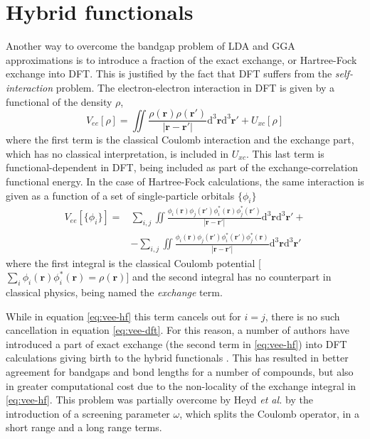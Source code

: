 \section{Hybrid functionals}
\label{sec:app-hybrid}
Another way to overcome the bandgap problem of LDA and GGA approximations is to introduce a fraction of the exact exchange, or Hartree-Fock exchange into DFT. This is justified by the fact that DFT suffers from the \textit{self-interaction} problem. The electron-electron interaction in DFT is given by a functional of the density $\rho$,
\begin{equation}
 V_{ee}[\rho] = \iint \frac{\rho(\bm{r})\rho(\bm{r'})}{|\bm{r}-\bm{r'}|} \mathrm{d^3}\bm{r}\mathrm{d^3}\bm{r'} + U_{xc}[\rho]
 \label{eq:vee-dft}
\end{equation}
where the first term is the classical Coulomb interaction and the exchange part, which has no classical interpretation, is included in $U_{xc}$. This last term is functional-dependent in DFT, being included as part of the exchange-correlation functional energy. In the case of Hartree-Fock calculations, the same interaction is given as a function of a set of single-particle orbitals $\{\phi_i\}$
\begin{align}
 V_{ee}[\{\phi_i\}] =& \sum_{i,j} \iint \frac{\phi_i(\bm{r})\phi_j(\bm{r'})\phi_i^*(\bm{r})\phi_j^*(\bm{r'})}{|\bm{r}-\bm{r'}|} \mathrm{d^3}\bm{r} \mathrm{d^3}\bm{r'} + \nonumber \\ &- \sum_{i,j}\iint \frac{\phi_i(\bm{r})\phi_j(\bm{r'})\phi_i^*(\bm{r'})\phi_j^*(\bm{r})}{|\bm{r}-\bm{r'}|} \mathrm{d^3}\bm{r} \mathrm{d^3}\bm{r'}
 \label{eq:vee-hf}
\end{align}
where the first integral is the classical Coulomb potential [$\sum_i \phi_i(\bm{r})\phi_i^*(\bm{r}) = \rho(\bm{r})$] and the second integral has no counterpart in classical physics, being named the \textit{exchange} term.

While in equation \ref{eq:vee-hf} this term cancels out for $i = j$, there is no such cancellation in equation \ref{eq:vee-dft}. For this reason, a number of authors have introduced a part of exact exchange (the second term in \ref{eq:vee-hf}) into DFT calculations giving birth to the hybrid functionals \cite{Perdew2001}. This has resulted in better agreement for bandgaps and bond lengths for a number of compounds, but also in greater computational cost due to the non-locality of the exchange integral in \ref{eq:vee-hf}. This problem was partially overcome by Heyd \textit{et al.} \cite{Heyd2003} by the introduction of a screening parameter $\omega$, which splits the Coulomb operator, in a short range and a long range terms.

